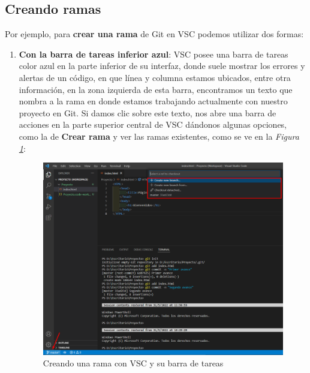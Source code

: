 \subsection{Creando ramas}

Por ejemplo, para \textbf{crear una rama} de Git en VSC podemos utilizar dos formas:
\begin{enumerate}
    \item \textbf{Con la barra de tareas inferior azul}: VSC posee una barra de tareas color azul en la parte inferior de su interfaz, donde suele mostrar los errores y alertas de un código, en que línea y columna estamos ubicados, entre otra información, en la zona izquierda de esta barra, encontramos un texto que nombra a la rama en donde estamos trabajando actualmente con nuestro proyecto en Git. Si damos clic sobre este texto, nos abre una barra de acciones en la parte superior central de VSC dándonos algunas opciones, como la de \textbf{Crear rama} y ver las ramas existentes, como se ve en la \textit{Figura \ref{fig: 17}}:
    \begin{figure}[H]
        \centering
        \caption{Creando una rama con VSC y su barra de tareas}
        \label{fig: 17}
        \includegraphics[width=\textwidth]{capturas/creando_b1.png}
    \end{figure}
    

\end{enumerate}
